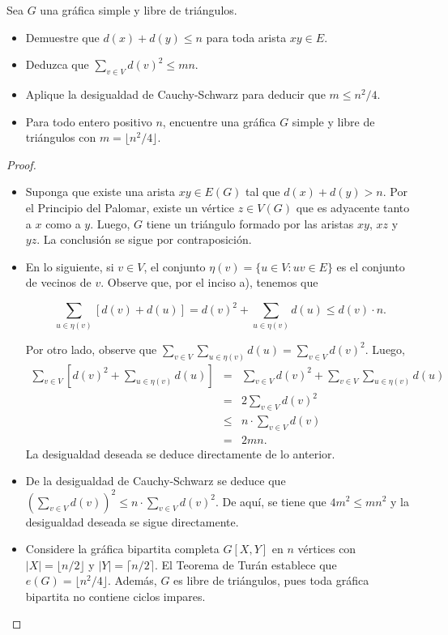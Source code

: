 \documentclass[12pt]{article}
\newenvironment{problem}[2][Problema]{\begin{trivlist}
\item[\hskip \labelsep {\bfseries #1}\hskip \labelsep {\bfseries #2.}]}{\end{trivlist}}
\begin{document}
\begin{problem}{2.1.17} Sea $G$ una gráfica simple y libre de triángulos.
\begin{itemize}
    \item[a)] Demuestre que $d(x) + d(y) \leq n$ para toda arista $xy \in E.$ 
    \item[b)] Deduzca que $\sum_{v \in V} d(v)^2 \leq mn.$
    \item[c)] Aplique la desigualdad de Cauchy-Schwarz para deducir que $m \leq n^2/4.$
    \item[d)] Para todo entero positivo $n$, encuentre una gráfica $G$ simple y libre de triángulos con $m= \lfloor n^2/4 \rfloor$. 
\end{itemize}

\end{problem}
\begin{proof}\text{}
\begin{itemize}
    \item[a)] Suponga que existe una arista $x y \in E(G)$ tal que $d(x) + d(y) > n$. Por el Principio del Palomar, existe un vértice $z \in V(G)$ que es adyacente tanto a $x$ como a $y.$ Luego, $G$ tiene un triángulo formado por las aristas $xy$, $xz$ y $yz.$ La conclusión se sigue por contraposición. 
    \item[b)] En lo siguiente, si $v \in V$, el conjunto $\eta(v) = \{u \in V: uv \in E\}$ es el conjunto de vecinos de $v.$ Observe que, por el inciso a), tenemos que 
    
    $$\sum_{u \in \eta(v)}[ d(v) + d(u) ]= d(v)^2 + \sum_{u \in \eta(v)} d(u) \leq d(v) \cdot n.$$
    
    Por otro lado, observe que $\sum_{v \in V} \sum_{u \in \eta(v)} d(u) = \sum_{v \in V} d(v)^2$. Luego,
    \begin{eqnarray*}
    \sum_{v \in V} [d(v)^2 + \sum_{u \in \eta(v) } d(u) ] &=& \sum_{v \in V} d(v)^2 + \sum_{v \in V} \sum_{u \in \eta(v)} d(u)\\
    &=& 2 \sum_{v \in V} d(v)^2 \\
    &\leq& n \cdot \sum_{v \in V} d(v) \\
    &=& 2mn.
    \end{eqnarray*}
    La desigualdad deseada se deduce directamente de lo anterior.
    \item[c)]De la desigualdad de Cauchy-Schwarz se deduce que $\left( \sum_{v \in V} d(v)  \right)^2 \leq n \cdot \sum_{v \in V} d(v)^2$. De aquí, se tiene que $4m^2 \leq mn^2$ y la desigualdad deseada se sigue directamente. 
    \item[d)] Considere la gráfica bipartita completa $G[X, Y]$ en $n$ vértices con $\lvert X \rvert = \lfloor n/2 \rfloor$ y $\lvert Y \rvert = \lceil n/2 \rceil.$ El Teorema de Turán establece que $e(G) = \lfloor n^2/4 \rfloor.$ Además, $G$ es libre de triángulos, pues toda gráfica bipartita no contiene ciclos impares.
    
    
\end{itemize}
\end{proof}
\end{document}
